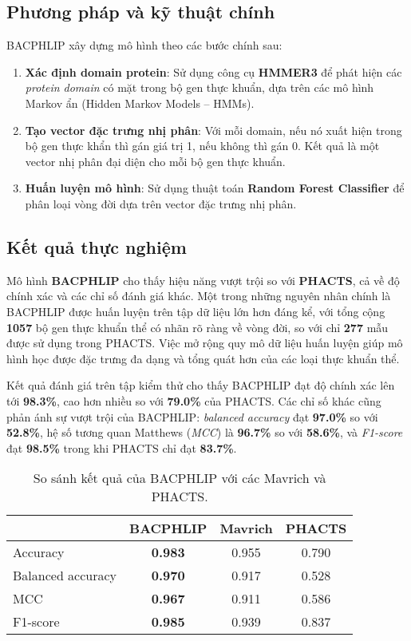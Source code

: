 \subsection*{Phương pháp và kỹ thuật chính}

BACPHLIP xây dựng mô hình theo các bước chính sau:

\begin{enumerate}
    \item \textbf{Xác định domain protein}: Sử dụng công cụ \textbf{HMMER3} để phát hiện các \textit{protein domain} có mặt trong bộ gen thực khuẩn, dựa trên các mô hình Markov ẩn (Hidden Markov Models – HMMs).
    
    \item \textbf{Tạo vector đặc trưng nhị phân}: Với mỗi domain, nếu nó xuất hiện trong bộ gen thực khẩn thì gán giá trị 1, nếu không thì gán 0. Kết quả là một vector nhị phân đại diện cho mỗi bộ gen thực khuẩn.
    
    \item \textbf{Huấn luyện mô hình}: Sử dụng thuật toán \textbf{Random Forest Classifier} để phân loại vòng đời dựa trên vector đặc trưng nhị phân.
\end{enumerate}

\subsection*{Kết quả thực nghiệm}
Mô hình \textbf{BACPHLIP} cho thấy hiệu năng vượt trội so với \textbf{PHACTS}, cả về độ chính xác và các chỉ số đánh giá khác. Một trong những nguyên nhân chính là BACPHLIP được huấn luyện trên tập dữ liệu lớn hơn đáng kể, với tổng cộng \textbf{1057} bộ gen thực khuẩn thể có nhãn rõ ràng về vòng đời, so với chỉ \textbf{277} mẫu được sử dụng trong PHACTS. Việc mở rộng quy mô dữ liệu huấn luyện giúp mô hình học được đặc trưng đa dạng và tổng quát hơn của các loại thực khuẩn thể.

Kết quả đánh giá trên tập kiểm thử cho thấy BACPHLIP đạt độ chính xác lên tới \textbf{98.3\%}, cao hơn nhiều so với \textbf{79.0\%} của PHACTS. Các chỉ số khác cũng phản ánh sự vượt trội của BACPHLIP: \textit{balanced accuracy} đạt \textbf{97.0\%} so với \textbf{52.8\%}, hệ số tương quan Matthews (\textit{MCC}) là \textbf{96.7\%} so với \textbf{58.6\%}, và \textit{F1-score} đạt \textbf{98.5\%} trong khi PHACTS chỉ đạt \textbf{83.7\%}. 
\begin{table}[h]
\centering
\caption{So sánh kết quả của BACPHLIP với các Mavrich và PHACTS.}
\label{tab:BACPHLIP_result}
\begin{tabular}{lccc}
\hline
& \textbf{BACPHLIP} & \textbf{Mavrich} & \textbf{PHACTS} \\
\hline
Accuracy          & \textbf{0.983} & 0.955 & 0.790  \\
Balanced accuracy & \textbf{0.970} & 0.917 & 0.528 \\
MCC               & \textbf{0.967} & 0.911 & 0.586 \\
F1-score          & \textbf{0.985} & 0.939 & 0.837 \\
\hline
\end{tabular}
\end{table}
